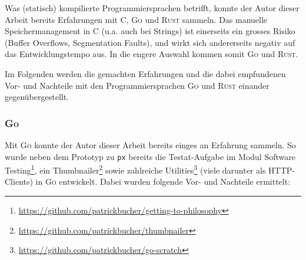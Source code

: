 Was (statisch) kompilierte Programmiersprachen betrifft, konnte der Autor dieser Arbeit bereits Erfahrungen mit C, \textsc{Go} und \textsc{Rust} sammeln. Das manuelle Speichermanagement in C (u.a. auch bei Strings) ist einerseits ein grosses Risiko (Buffer Overflows, Segmentation Faults), und wirkt sich andererseits negativ auf das Entwicklungstempo aus. In die engere Auswahl kommen somit \textsc{Go} und \textsc{Rust}.

Im Folgenden werden die gemachten Erfahrungen und die dabei empfundenen Vor- und Nachteile mit den Programmiersprachen \textsc{Go} und \textsc{Rust} einander gegenübergestellt.

\subsubsection{\textsc{Go}}

Mit \textsc{Go} konnte der Autor dieser Arbeit bereits einges an Erfahrung sammeln. So wurde neben dem Prototyp zu \texttt{px} bereits die Testat-Aufgabe im Modul Software Testing\footnote{\url{https://github.com/patrickbucher/getting-to-philosophy}}, ein Thumbnailer\footnote{\url{https://github.com/patrickbucher/thumbnailer}} sowie zahlreiche Utilities\footnote{\url{https://github.com/patrickbucher/go-scratch}} (viele darunter als HTTP-Clients) in \textsc{Go} entwickelt. Dabei wurden folgende Vor- und Nachteile ermittelt:

